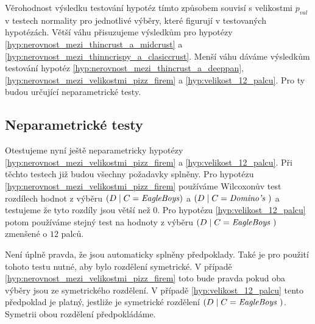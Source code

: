 \begin{note}
	Věrohodnost výsledku testování hypotéz tímto způsobem souvisí s velikostmi $p_{val}$ v testech
	normality pro jednotlivé výběry, které figurují v testovaných hypotézách. Větší
	váhu přisuzujeme výsledkům pro hypotézy \ref{hyp:nerovnost_mezi_thincrust_a_midcrust} a
	\ref{hyp:nerovnost_mezi_thinncrispy_a_clasiccrust}. Menší váhu dáváme výsledkům testování hypotéz
	\ref{hyp:nerovnost_mezi_thincrust_a_deeppan}, \ref{hyp:nerovnost_mezi_velikostmi_pizz_firem} a
	\ref{hyp:velikost_12_palcu}. Pro ty budou určující neparametrické testy.
\end{note}


\subsection{Neparametrické testy}%
\label{sub:neparametrické_testy}

Otestujeme nyní ještě neparametricky hypotézy \ref{hyp:nerovnost_mezi_velikostmi_pizz_firem} a
\ref{hyp:velikost_12_palcu}. Při těchto testech již budou všechny požadavky splněny. Pro hypotézu
\ref{hyp:nerovnost_mezi_velikostmi_pizz_firem} používáme Wilcoxonův test rozdílech hodnot z
výběru \(\left( D \mid C = \text{\emph{EagleBoys}} \right)\) a \(\left( D \mid C =
\text{\emph{Domino's} } \right)\) a testujeme že tyto rozdíly jsou větší než \(0\).  Pro hypotézu
\ref{hyp:velikost_12_palcu} potom používáme stejný test na hodnoty z výběru \(\left( D \mid C =
\text{\emph{EagleBoys} } \right)\) zmenšené o \(12\) palců.

\begin{note}
	Není úplně pravda, že jsou automaticky splněny předpoklady. Také je pro použití tohoto testu
	nutné, aby bylo rozdělení symetrické. V případě \ref{hyp:nerovnost_mezi_velikostmi_pizz_firem}
	toto bude pravda pokud oba výběry jsou ze symetrického rozdělení. V případě
	\ref{hyp:velikost_12_palcu} tento předpoklad je platný, jestliže je symetrické rozdělení  \(\left( D \mid C =
	\text{\emph{EagleBoys} } \right)\). Symetrii obou rozdělení předpokládáme.
\end{note}


